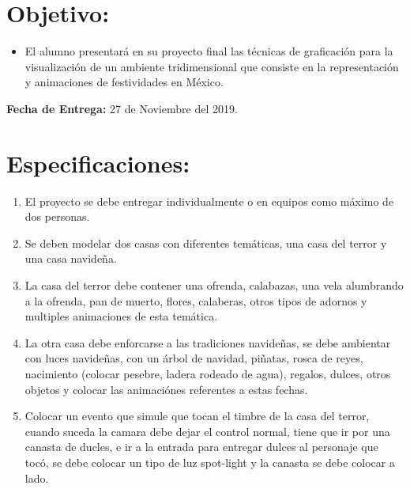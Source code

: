 \documentclass[12pt,letterpaper]{article}
\begin{document}
\section*{Objetivo:}
\begin{itemize}
\item El alumno presentar\'a en su proyecto final las t\'ecnicas de graficación para la visualizaci\'on de un ambiente tridimensional que consiste en la representaci\'on y animaciones de festividades en M\'exico. 
\end{itemize}

\textbf{Fecha de Entrega:} 27 de Noviembre del 2019.


\section*{Especificaciones:}

\begin{enumerate}
\item El proyecto se debe entregar individualmente o en equipos como m\'aximo de dos personas.
\item Se deben modelar dos casas con diferentes tem\'aticas, una casa del terror y una casa navideña.
\item La casa del terror debe contener una ofrenda, calabazas, una vela alumbrando a la ofrenda, pan de muerto, flores, calaberas, otros tipos de adornos y multiples animaciones de esta tem\'atica.
\item La otra casa debe enforcarse a las tradiciones navideñas, se debe ambientar con luces navideñas, con un \'arbol de navidad, piñatas, rosca de reyes, nacimiento (colocar pesebre, ladera rodeado de agua), regalos, dulces, otros objetos y colocar las animaci\'ones referentes a estas fechas.
\item Colocar un evento que simule que tocan el timbre de la casa del terror, cuando suceda la camara debe dejar el control normal, tiene que ir por una canasta de ducles, e ir a la entrada para entregar dulces al personaje que tocó, se debe colocar un tipo de luz spot-light y la canasta se debe colocar a lado.
\end{enumerate}
\end{document}
